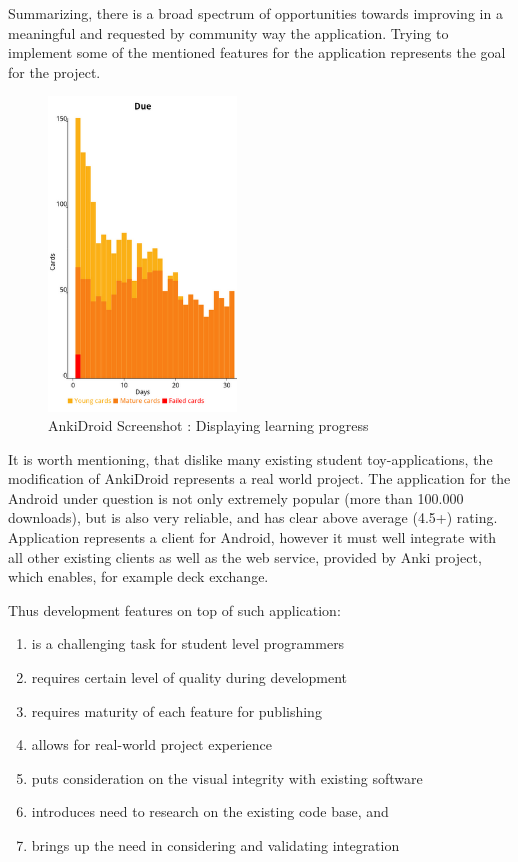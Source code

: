 \documentclass[a4paper,11pt,twoside]{article}
\begin{document}
Summarizing, there is a broad spectrum of opportunities towards improving in a meaningful and requested by community
way the application. Trying to implement some of the mentioned features for the application represents the goal for the project.


\begin{figure}[t]
\centering
\label{fig:Learnproc}
\includegraphics[width=5cm]{Screenshot2}
\caption{AnkiDroid Screenshot : Displaying learning progress}
\end{figure}


It is worth mentioning, that dislike many existing student toy-applications, the modification of AnkiDroid represents a real world project.
The application for the Android under question is not only extremely popular (more than 100.000 downloads), but is also very reliable,
and has clear above average (4.5+) rating. Application represents a client for Android, however it must well integrate with all other
existing clients as well as the web service, provided by Anki project, which enables, for example deck exchange.

Thus development features on top of such application:
\begin{enumerate}
  \item is a challenging task for student level programmers
  \item requires certain level of quality during development
  \item requires maturity of each feature for publishing
  \item allows for real-world project experience
  \item puts consideration on the visual integrity with existing software
  \item introduces need to research on the existing code base, and
  \item brings up the need in considering and validating integration
\end{enumerate}
\end{document}
